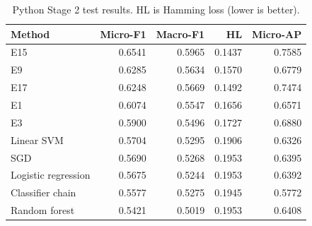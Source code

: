 \begin{table}[htbp]
\centering\small
\caption{Python Stage 2 test results. HL is Hamming loss (lower is better).}\label{tab:pythontest}
\begin{tabular}{lrrrr}\toprule
Method & Micro-F1 & Macro-F1 & HL & Micro-AP\\\midrule
E15 & 0.6541 & 0.5965 & 0.1437 & 0.7585\\
E9 & 0.6285 & 0.5634 & 0.1570 & 0.6779\\
E17 & 0.6248 & 0.5669 & 0.1492 & 0.7474\\
E1 & 0.6074 & 0.5547 & 0.1656 & 0.6571\\
E3 & 0.5900 & 0.5496 & 0.1727 & 0.6880\\
Linear SVM & 0.5704 & 0.5295 & 0.1906 & 0.6326\\
SGD & 0.5690 & 0.5268 & 0.1953 & 0.6395\\
Logistic regression & 0.5675 & 0.5244 & 0.1953 & 0.6392\\
Classifier chain & 0.5577 & 0.5275 & 0.1945 & 0.5772\\
Random forest & 0.5421 & 0.5019 & 0.1953 & 0.6408\\
\bottomrule\end{tabular}
\end{table}

